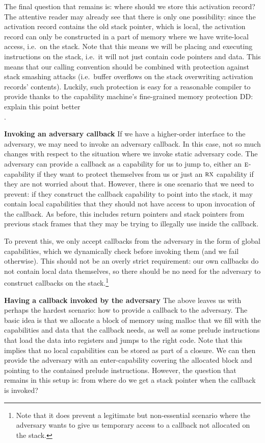 \documentclass[acmsmall,review]{acmart}\settopmatter{printfolios=true}
\newcommand\dominique[1]{{\color{purple} \sf \footnotesize {DD: #1}}\\}
\newcommand{\plainperm}[1]{\textsc{#1}}
\newcommand{\exec}{\plainperm{rx}}
\newcommand{\entry}{\plainperm{e}}
\begin{document}
The final question that remains is: where should we store this activation
record? The attentive reader may already see that there is only one possibility:
since the activation record contains the old stack pointer, which is local, the
activation record can only be constructed in a part of memory where we have
write-local access, i.e.\ on the stack. Note that this means we will be placing
and executing instructions on the stack, i.e.\ it will not just contain code
pointers and data. This means that our calling convention should be combined
with protection against stack smashing attacks (i.e.\ buffer overflows on the
stack overwriting activation records' contents). Luckily, such protection is
easy for a reasonable compiler to provide thanks to the capability machine's
fine-grained memory protection\dominique{explain this point better}.

\textbf{Invoking an adversary callback} If we have a higher-order interface to
the adversary, we may need to invoke an adversary callback. In this case, not so
much changes with respect to the situation where we invoke static adversary
code. The adversary can provide a callback as a capability for us to jump to,
either an $\entry$-capability if they want to protect themselves from us or just
an $\exec$ capability if they are not worried about that. However, there is one
scenario that we need to prevent: if they construct the callback capability to
point into the stack, it may contain local capabilities that they should not
have access to upon invocation of the callback. As before, this includes return
pointers and stack pointers from previous stack frames that they may be
trying to illegally use inside the callback.

To prevent this, we only accept callbacks from the adversary in the form of
global capabilities, which we dynamically check before invoking them (and we
fail otherwise). This should not be an overly strict requirement: our own
callbacks do not contain local data themselves, so there should be no need for
the adversary to construct callbacks on the stack.\footnote{Note that it does
  prevent a legitimate but non-essential scenario where the adversary wants to
  give us temporary access to a callback not allocated on the stack.}

\textbf{Having a callback invoked by the adversary} The above leaves us with
perhaps the hardest scenario: how to provide a callback to the adversary. The
basic idea is that we allocate a block of memory using malloc that we fill with
the capabilities and data that the callback needs, as well as some
prelude instructions that load the data into registers and jumps to the right
code. Note that this implies that no local capabilities can be stored as part of
a closure. We can then provide the adversary with an enter-capability covering
the allocated block and pointing to the contained prelude instructions. However,
the question that remains in this setup is: from where do we get a stack pointer when
the callback is invoked?
\end{document}
